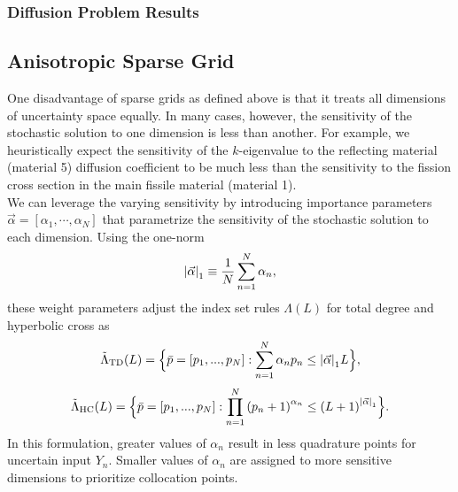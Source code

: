 \documentclass{mc2015}
\begin{document}
\subsubsection{Diffusion Problem Results}



\subsection{Anisotropic Sparse Grid}
One disadvantage of sparse grids as defined above is that it treats all dimensions of uncertainty space equally.  In many cases, however, the sensitivity of the stochastic solution to one dimension is less than another.  For example, we heuristically expect the sensitivity of the $k$-eigenvalue to the reflecting material (material 5) diffusion coefficient to be much less than the sensitivity to the fission cross section in the main fissile material (material 1).  \\

We can leverage the varying sensitivity by introducing importance parameters $\vec\alpha=[\alpha_1,\cdots,\alpha_N]$ that parametrize the sensitivity of the stochastic solution to each dimension.  Using the one-norm
\begin{equation}
\qty|\vec\alpha|_1\equiv\frac{1}{N}\sum_{n=1}^N \alpha_n,
\end{equation}
these weight parameters adjust the index set rules $\Lambda(L)$ for total degree and hyperbolic cross as
\begin{equation}
\tilde\Lambda_\text{TD}(L)=\Big\{\bar p=[p_1,...,p_N]:\sum_{n=1}^N \alpha_n p_n \leq \qty|\vec\alpha|_1 L \Big\},
\end{equation}
\begin{equation}
\tilde\Lambda_\text{HC}(L)=\Big\{\bar p=[p_1,...,p_N]:\prod_{n=1}^N \qty(p_n+1)^{\alpha_n} \leq \qty(L+1)^{\qty|\vec\alpha|_1} \Big\}.
\end{equation}
In this formulation, greater values of $\alpha_n$ result in less quadrature points for uncertain input $Y_n$.  Smaller values of $\alpha_n$ are assigned to more sensitive dimensions to prioritize collocation points.
\end{document}
